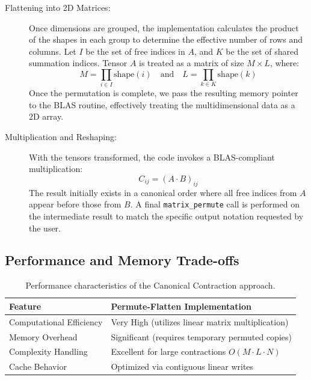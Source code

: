 \documentclass[binding=0.6cm]{sapthesis}
\begin{document}
\begin{description}
	\item [Flattening into 2D Matrices:] Once dimensions are grouped, the implementation calculates the product of the shapes in each group to determine the effective number of rows and columns. Let $I$ be the set of free indices in $A$, and $K$ be the set of shared summation indices. Tensor $A$ is treated as a matrix of size $M \times L$, where:
	      \begin{equation}
		      M = \prod_{i \in I} \text{shape}(i) \quad \text{and} \quad L = \prod_{k \in K} \text{shape}(k)
	      \end{equation}
	      Once the permutation is complete, we pass the resulting memory pointer to the BLAS routine, effectively treating the multidimensional data as a 2D array.

	\item [Multiplication and Reshaping:] With the tensors transformed, the code invokes a BLAS-compliant multiplication:
	      \begin{equation}
		      C_{ij} = (A \cdot B)_{ij}
	      \end{equation}
	      The result initially exists in a canonical order where all free indices from $A$ appear before those from $B$. A final \texttt{matrix\_permute} call is performed on the intermediate result to match the specific output notation requested by the user.
\end{description}


\subsection{Performance and Memory Trade-offs}

\begin{table}[h]
	\centering
	\begin{tabular}{|l|l|}
		\hline
		\textbf{Feature}         & \textbf{Permute-Flatten Implementation}                 \\ \hline
		Computational Efficiency & Very High (utilizes linear matrix multiplication)       \\ \hline
		Memory Overhead          & Significant (requires temporary permuted copies)        \\ \hline
		Complexity Handling      & Excellent for large contractions $O(M \cdot L \cdot N)$ \\ \hline
		Cache Behavior           & Optimized via contiguous linear writes                  \\ \hline
	\end{tabular}
	\caption{Performance characteristics of the Canonical Contraction approach.}
\end{table}
\end{document}
